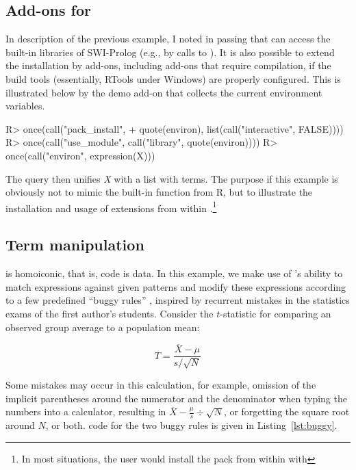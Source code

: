 \documentclass[article]{jss}
\begin{document}
\subsection[Add-ons for Prolog]{Add-ons for }

In description of the previous example, I noted in passing that  can
access the built-in libraries of SWI-Prolog (e.g., by calls
to ). It is also possible to extend the installation by
add-ons, including add-ons that require compilation, if the build
tools (essentially, RTools under Windows) are properly configured. This is
illustrated below by the demo add-on  \citep{Environ} that collects
the current environment variables.

\begin{Schunk}
\begin{Sinput}
R> once(call("pack_install", 
+            quote(environ), list(call("interactive", FALSE))))
R> once(call("use_module", call("library", quote(environ))))
R> once(call("environ", expression(X)))
\end{Sinput}
\end{Schunk}

The query then unifies \emph{X} with a list with  terms. The
purpose if this example is obviously not to mimic the built-in
function  from R, but to illustrate the installation and 
usage of  extensions from within .\footnote{In most
situations, the user would install the pack from within  with
}

\subsection{Term manipulation}

 is homoiconic, that is, code is data. In this example, we make
use of 's ability to match expressions against given patterns
and modify these expressions according to a few 
predefined ``buggy rules'' \citep{Brown1978}, inspired by recurrent mistakes in
the statistics exams of the first author's students. Consider the $t$-statistic
for comparing an observed group average to a population mean:

\begin{equation}
T = \frac{\overline{X} - \mu}{s / \sqrt{N}}
\end{equation}

Some mistakes may occur in this calculation, for example, omission of the
implicit parentheses around the numerator and the denominator when typing the
numbers into a calculator, resulting 
in $\overline{X} - \frac{\mu}{s} \div \sqrt{N}$, or forgetting the square root
around $N$, or both.  code for the two buggy rules is given in
Listing~\ref{lst:buggy}.
\end{document}
